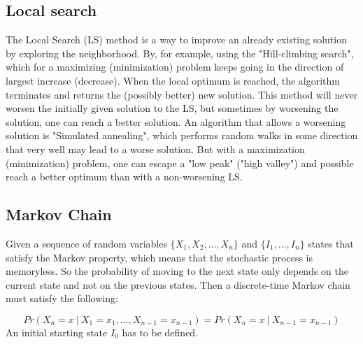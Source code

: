 \documentclass[a4paper,12pt]{article}
\begin{document}
\bigbreak
\subsection{Local search}

The Local Search (LS) method is a way to improve an already existing solution by exploring the neighborhood. By, for example, using the "Hill-climbing search", which for a maximizing (minimization) problem keeps going in the direction of largest increase (decrease). When the local optimum is reached, the algorithm terminates and returns the (possibly better) new solution. This method will never worsen the initially given solution to the LS, but sometimes by worsening the solution, one can reach a better solution. An algorithm that allows a worsening solution is "Simulated annealing", which performs random walks in some direction that very well may lead to a worse solution. But with a maximization (minimization) problem, one can escape a "low peak" ("high valley") and possible reach a better optimum than with a non-worsening LS.

\bigbreak
\subsection{Markov Chain}

Given a sequence of random variables $\{X_1,X_2,...,X_n\}$ and $\{I_1,\dots,I_n\}$ states that satisfy the Markov property, which means that the stochastic process is memoryless. So the probability of moving to the next state only depends on the current state and not on the previous states. Then a discrete-time Markov chain must satisfy the following:

\[ Pr(X_{n} = x \ | \ X_1 = x_1, \dots , X_{n-1} = x_{n-1}) = Pr(X_{n} = x \ | \ X_{n-1} = x_{n-1}) 
\]
An initial starting state $I_0$ has to be defined.
\end{document}
